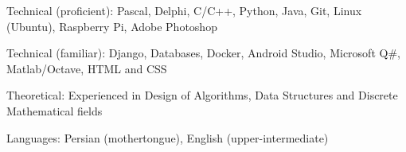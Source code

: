 

\begin{cvskills}

  \cvskill
    {Technical (proficient):}
    {Pascal, Delphi, C/C++, Python, Java, Git, Linux (Ubuntu), Raspberry Pi, Adobe Photoshop}

  \cvskill
    {Technical (familiar):}
    {Django, Databases, Docker, Android Studio, Microsoft Q\#, Matlab/Octave, HTML and CSS}

  \cvskill
    {Theoretical:}
    {Experienced in Design of Algorithms, Data Structures and Discrete Mathematical fields}

  \cvskill
    {Languages:}
    {Persian (mothertongue), English (upper-intermediate)} %

\end{cvskills}
